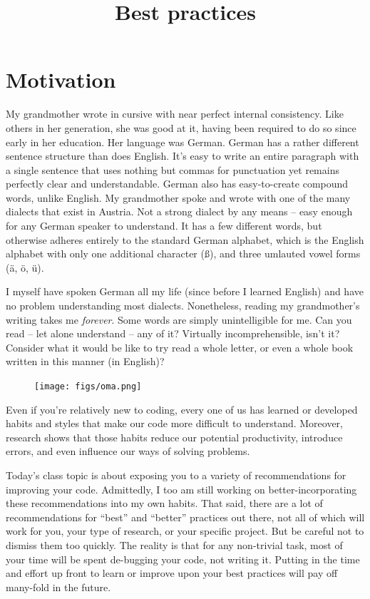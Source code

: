 \documentclass[12pt,letterpaper]{article}
\author{}
\title{Best practices}
\begin{document}
\maketitle
\date{}

\tableofcontents

\pagebreak

\section{Motivation}

My grandmother wrote in cursive with near perfect internal consistency.
Like others in her generation, she was good at it, having been required to do so since early in her education.
Her language was German.
German has a rather different sentence structure than does English.
It's easy to write an entire paragraph with a single sentence that uses nothing but commas for punctuation yet remains perfectly clear and understandable.
German also has easy-to-create compound words, unlike English.
My grandmother spoke and wrote with one of the many dialects that exist in Austria.
Not a strong dialect by any means -- easy enough for any German speaker to understand.
It has a few different words, but otherwise adheres entirely to the standard German alphabet, which is the English alphabet with only one additional character ({\ss}), and three umlauted vowel forms (\"{a}, \"{o}, \"{u}).

I myself have spoken German all my life (since before I learned English) and have no problem understanding most dialects.
Nonetheless, reading my grandmother's writing takes me \emph{forever}.
Some words are simply unintelligible for me.
Can you read -- let alone understand -- any of it?
Virtually incomprehensible, isn't it?
Consider what it would be like to try read a whole letter, or even a whole book written in this manner (in English)?

\begin{figure}[H]
	\centering
	\texttt{[image: figs/oma.png]}
\end{figure}

Even if you're relatively new to coding, every one of us has learned or developed habits and styles that make our code more difficult to understand.
Moreover, research shows that those habits reduce our potential productivity, introduce errors, and even influence our ways of solving problems.

Today's class topic is about exposing you to a variety of recommendations for improving your code.
Admittedly, I too am still working on better-incorporating these recommendations into my own habits.
That said, there are a lot of recommendations for ``best'' and ``better'' practices out there, not all of which will work for you, your type of research, or your specific project.
But be careful not to dismiss them too quickly.
The reality is that for any non-trivial task, most of your time will be spent de-bugging your code, not writing it.
Putting in the time and effort up front to learn or improve upon your best practices will pay off many-fold in the future.
\end{document}
